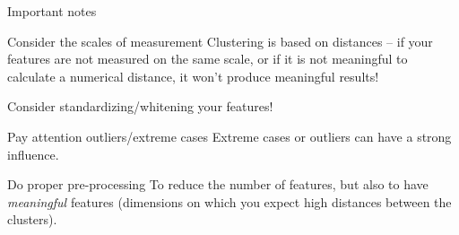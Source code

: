 \begin{frame}{Important notes}
\begin{block}{Consider the scales of measurement}
Clustering is based on distances -- if your features are not measured on the same scale, or if it is not meaningful to calculate a numerical distance, it won't produce meaningful results!

Consider standardizing/whitening your features!
\end{block}

\pause

\begin{block}{Pay attention outliers/extreme cases}
Extreme cases or outliers can have a strong influence.
\end{block}

\pause 
\begin{block}{Do proper pre-processing}
To reduce the number of features, but also to have \emph{meaningful} features (dimensions on which you expect high distances between the clusters).
\end{block}


\end{frame}






